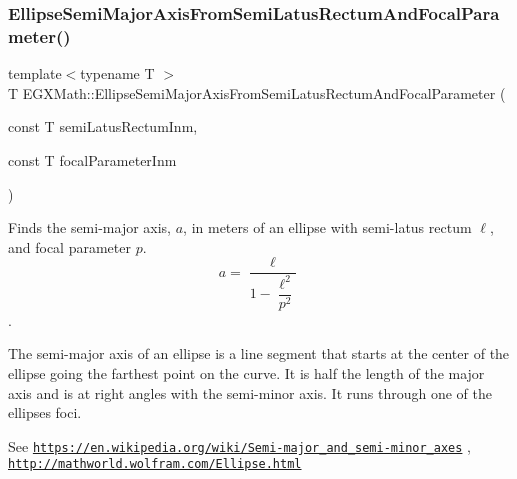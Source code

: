 \mbox{\label{group___e_g_x_math-_geometry-2_d-_ellipse-_semi_major_axis_gaea152a91fc8eb6532f497e9d25f0477c}} 
\subsubsection{\texorpdfstring{Ellipse\+Semi\+Major\+Axis\+From\+Semi\+Latus\+Rectum\+And\+Focal\+Parameter()}{EllipseSemiMajorAxisFromSemiLatusRectumAndFocalParameter()}}
{\footnotesize\ttfamily template$<$typename T $>$ \\
T E\+G\+X\+Math\+::\+Ellipse\+Semi\+Major\+Axis\+From\+Semi\+Latus\+Rectum\+And\+Focal\+Parameter (\begin{DoxyParamCaption}\item[{const T}]{semi\+Latus\+Rectum\+Inm,  }\item[{const T}]{focal\+Parameter\+Inm }\end{DoxyParamCaption})}



Finds the semi-\/major axis, $a$, in meters of an ellipse with semi-\/latus rectum $\ell$, and focal parameter $p$. \[ a=\dfrac{\ell}{1-\dfrac{\ell^2}{p^2}} \]. 

The semi-\/major axis of an ellipse is a line segment that starts at the center of the ellipse going the farthest point on the curve. It is half the length of the major axis and is at right angles with the semi-\/minor axis. It runs through one of the ellipses foci.

See \href{https://en.wikipedia.org/wiki/Semi-major_and_semi-minor_axes}{\tt https\+://en.\+wikipedia.\+org/wiki/\+Semi-\/major\+\_\+and\+\_\+semi-\/minor\+\_\+axes} , \href{http://mathworld.wolfram.com/Ellipse.html}{\tt http\+://mathworld.\+wolfram.\+com/\+Ellipse.\+html}


